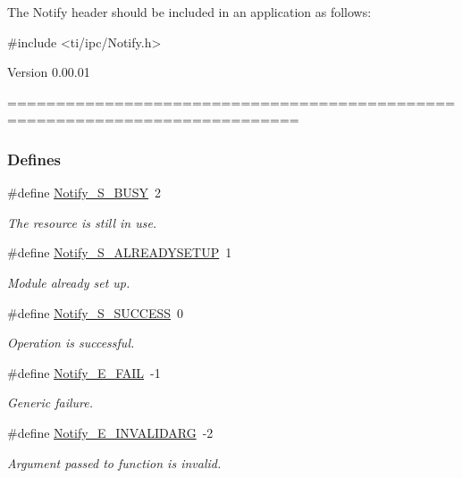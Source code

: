 The Notify header should be included in an application as follows: 
\begin{DoxyCode}
  #include <ti/ipc/Notify.h>
\end{DoxyCode}


\begin{DoxyVersion}{Version}
0.00.01
\end{DoxyVersion}
============================================================================ \subsubsection*{Defines}
\begin{DoxyCompactItemize}
\item 
\#define \hyperlink{_notify_8h_a0d58ddfdb5d08f6ca1de749701033450}{Notify\_\-S\_\-BUSY}~2
\begin{DoxyCompactList}\small\item\em The resource is still in use. \item\end{DoxyCompactList}\item 
\#define \hyperlink{_notify_8h_a4a3b8a694b528547f8478d0b9e24289c}{Notify\_\-S\_\-ALREADYSETUP}~1
\begin{DoxyCompactList}\small\item\em Module already set up. \item\end{DoxyCompactList}\item 
\#define \hyperlink{_notify_8h_a846ddddd026310bcbcda9837a3571ba4}{Notify\_\-S\_\-SUCCESS}~0
\begin{DoxyCompactList}\small\item\em Operation is successful. \item\end{DoxyCompactList}\item 
\#define \hyperlink{_notify_8h_a20a2a59166c514c653d7eed49344566e}{Notify\_\-E\_\-FAIL}~-\/1
\begin{DoxyCompactList}\small\item\em Generic failure. \item\end{DoxyCompactList}\item 
\#define \hyperlink{_notify_8h_a31fc3f7c99af3b98e9fd9f666cc4e2f3}{Notify\_\-E\_\-INVALIDARG}~-\/2
\begin{DoxyCompactList}\small\item\em Argument passed to function is invalid. \item\end{DoxyCompactList}\item 

\end{DoxyCompactItemize}
